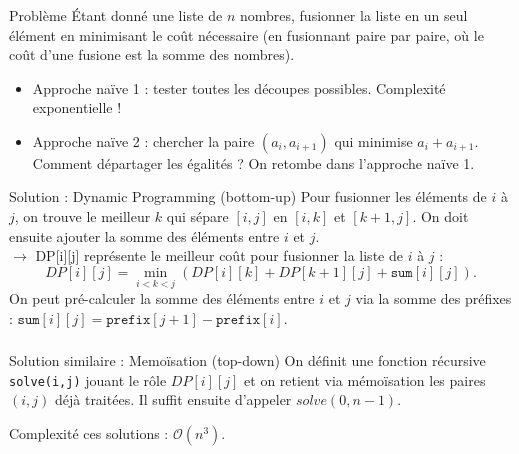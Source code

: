 \begin{frame}
    \frametitle{\problemtitle}
    \begin{block}{Problème}
        Étant donné une liste de $n$ nombres, fusionner la liste en un seul élément en minimisant le coût nécessaire (en fusionnant paire par paire, où le coût d'une fusione est la somme des nombres).
    \end{block}
    \pause
    \begin{itemize}
        \item Approche naïve 1 : tester toutes les découpes possibles. Complexité exponentielle ! \pause
        \item Approche naïve 2 : chercher la paire $(a_i,a_{i+1})$ qui minimise $a_i+a_{i+1}$. Comment départager les égalités ? On retombe dans l'approche naïve 1.
    \end{itemize}
    \pause
    \begin{block}{Solution : Dynamic Programming (bottom-up)}
        Pour fusionner les éléments de $i$ à $j$, on trouve le meilleur $k$ qui sépare $[i,j]$ en $[i,k]$ et $[k+1,j]$. On doit ensuite ajouter la somme des éléments entre $i$ et $j$. \\ \pause
        $\rightarrow$ DP[i][j] représente le meilleur coût pour fusionner la liste de $i$ à $j$ :
        \[
        DP[i][j] = \min_{i<k<j}(DP[i][k] + DP[k+1][j] + \texttt{sum}[i][j]).
        \]
        \pause
        On peut pré-calculer la somme des éléments entre $i$ et $j$ via la somme des préfixes : $\texttt{sum}[i][j] = \texttt{prefix}[j+1] - \texttt{prefix}[i]$.
    \end{block}
\end{frame}

\begin{frame}
    \frametitle{\problemtitle}
    \begin{block}{Solution similaire : Memo\"isation (top-down)}
       On définit une fonction récursive \texttt{solve(i,j)} jouant le rôle $DP[i][j]$ et on retient via mémoïsation les paires $(i,j)$ déjà traitées. Il suffit ensuite d'appeler $solve(0,n-1)$.
    \end{block}
    \pause
    Complexité ces solutions : $\mathcal{O}(n^3)$.

    \solvestats
\end{frame}